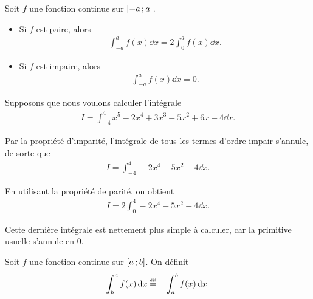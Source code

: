 \documentclass[main.tex]{subfiles}
\begin{document}
\begin{proposition}

    Soit $f$ une fonction continue sur $\mathopen{[}-a\,;a\mathclose{]}$.
    \begin{itemize}
        \item Si $f$ est paire, alors
            \begin{align}
                \int_{-a}^a f(x) \dd x = 2 \int_0^a f(x) \dd x.
            \end{align}
            \begin{plot}{0.5}{-6}{-1}{6}{5}
            \end{plot}
        \item Si $f$ est impaire, alors
            \begin{align}
                \int_{-a}^a f(x) \dd x = 0.
            \end{align}
            \begin{plot}{0.5}{-6}{-5}{6}{5}
            \end{plot}
    \end{itemize}
\end{proposition}

\begin{example}
    
    Supposons que nous voulons calculer l'intégrale
    \begin{align}
        I = \int_{-4}^4 x^5 - 2x^4 + 3x^3 - 5x^2 + 6x - 4 \dd x.
    \end{align}
    
    Par la propriété d'imparité,
    l'intégrale de tous les termes d'ordre impair s'annule,
    de sorte que
    \begin{align}
        I = \int_{-4}^4 - 2x^4 - 5x^2 - 4 \dd x.
    \end{align}
    
    En utilisant la propriété de parité,
    on obtient
    \begin{align}
        I = 2 \int_0^4 - 2x^4 - 5x^2 - 4 \dd x.
    \end{align}
    
    Cette dernière intégrale est nettement plus simple à calculer,
    car la primitive usuelle s'annule en $0$.
\end{example}

\begin{definition}

    Soit $f$ une fonction continue sur $\mathopen{[}a\,;b\mathclose{]}$.
    On définit
    \begin{align}
        \int_b^a f(x) \dd x \defeq -\int_a^b f(x) \dd x.
    \end{align}
\end{definition}
\end{document}
